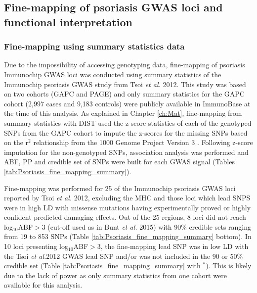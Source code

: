 \subsection{Fine-mapping of psoriasis GWAS loci and functional interpretation}

\subsubsection{Fine-mapping using summary statistics data}
Due to the impossibility of accessing genotyping data, fine-mapping of psoriasis Immunochip GWAS loci was conducted using summary statistics of the Immunochip psoriasis GWAS study from Tsoi \textit{et al.} 2012. This study was based on two cohorts (GAPC and PAGE) and only summary statistics for the GAPC cohort (2,997 cases and 9,183 controls) were publicly available in ImmunoBase at the time of this analysis. As explained in Chapter \ref{ch:Mat}, fine-mapping from summary statistics with DIST used the z-score statistics of each of the genotyped SNPs from the GAPC cohort to impute the z-scores for the missing SNPs based on the r$^2$ relationship from the 1000 Genome Project Version 3 \parencite{Lee2013}. Following z-score imputation for the non-genotyped SNPs, association analysis was performed and ABF, PP and credible set of SNPs were built for each GWAS signal (Tables \ref{tab:Psoriasis_fine_mapping_summary}).

Fine-mapping was performed for 25 of the Immunochip psoriasis GWAS loci reported by Tsoi \textit{et al.} 2012, excluding the MHC and those loci which lead SNPS were in high LD with missense mutations having experimentally proved or highly confident predicted damaging effects. Out of the 25 regions, 8 loci did not reach log$_{10}$ABF$>$3 (cut-off used as in Bunt \textit{et al.} 2015) with 90\% credible sets ranging from 19 to 853 SNPs (Table \ref{tab:Psoriasis_fine_mapping_summary} bottom). In 10 loci presenting log$_{10}$ABF$>$3, the fine-mapping lead SNP was in low LD with the Tsoi \textit{et al.}2012 GWAS lead SNP and/or was not included in the 90 or 50\% credible set (Table \ref{tab:Psoriasis_fine_mapping_summary} with $^\ast$). This is likely due to the lack of power as only summary statistics from one cohort were available for this analysis.


